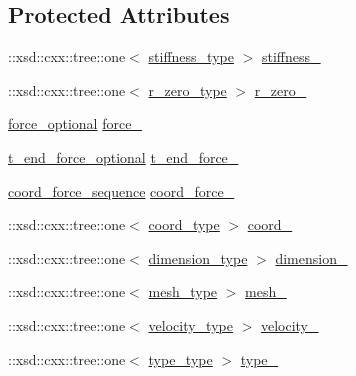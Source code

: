 \subsection*{Protected Attributes}
\begin{DoxyCompactItemize}
\item 
\+::xsd\+::cxx\+::tree\+::one$<$ \hyperlink{classmembrane__t_a9e55619d3d02a55660849deaa0ca4338}{stiffness\+\_\+type} $>$ \hyperlink{classmembrane__t_a7f034ef7743e351cf39eebc4e91609ca}{stiffness\+\_\+}
\item 
\+::xsd\+::cxx\+::tree\+::one$<$ \hyperlink{classmembrane__t_ab1e0c179101c4b2916059925d73468ff}{r\+\_\+zero\+\_\+type} $>$ \hyperlink{classmembrane__t_adfd88126f59646de24e2f7cbd181cdc6}{r\+\_\+zero\+\_\+}
\item 
\hyperlink{classmembrane__t_a558422b23faa72b3e4cbc060f9ff8ea3}{force\+\_\+optional} \hyperlink{classmembrane__t_a40f545e373f2c8625b14f77b1485221d}{force\+\_\+}
\item 
\hyperlink{classmembrane__t_a7725d61ae95e124d402a8d9db7a08376}{t\+\_\+end\+\_\+force\+\_\+optional} \hyperlink{classmembrane__t_ac71b2beba26a9e7c9b69faf4da0de697}{t\+\_\+end\+\_\+force\+\_\+}
\item 
\hyperlink{classmembrane__t_a2825c9df8bf471f2c5053a826cf6fcb0}{coord\+\_\+force\+\_\+sequence} \hyperlink{classmembrane__t_a4452b21f0eec366b16aeb3ffd5ef49a8}{coord\+\_\+force\+\_\+}
\item 
\+::xsd\+::cxx\+::tree\+::one$<$ \hyperlink{classmembrane__t_a0841f5bafc269d612a4b6fefcce1d73f}{coord\+\_\+type} $>$ \hyperlink{classmembrane__t_a994d9dbd6a74611dbcf464f77ffcf413}{coord\+\_\+}
\item 
\+::xsd\+::cxx\+::tree\+::one$<$ \hyperlink{classmembrane__t_afdd0310501689ebab285ec39821c5b76}{dimension\+\_\+type} $>$ \hyperlink{classmembrane__t_aa5fb7d3fefa37bd360d24cc7849bfea1}{dimension\+\_\+}
\item 
\+::xsd\+::cxx\+::tree\+::one$<$ \hyperlink{classmembrane__t_a259dfb54e3d4a66cdd72b5b0831f4188}{mesh\+\_\+type} $>$ \hyperlink{classmembrane__t_ae5676c4d93bd425bebd47c9649defe45}{mesh\+\_\+}
\item 
\+::xsd\+::cxx\+::tree\+::one$<$ \hyperlink{classmembrane__t_a41bad26c4626a8ceac158b3817306c62}{velocity\+\_\+type} $>$ \hyperlink{classmembrane__t_a22505f185660ba42d5fad386d6e1483e}{velocity\+\_\+}
\item 
\+::xsd\+::cxx\+::tree\+::one$<$ \hyperlink{classmembrane__t_a13eb0ee51a5a6018151503690e28e2fb}{type\+\_\+type} $>$ \hyperlink{classmembrane__t_ad8a6936861e18527605ef23e0fe44939}{type\+\_\+}
\end{DoxyCompactItemize}


